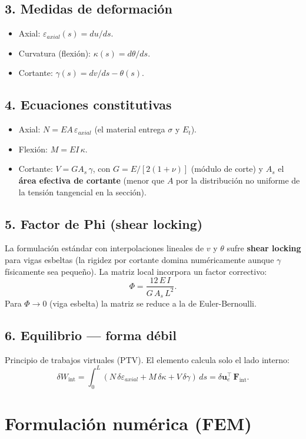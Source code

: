 \documentclass[11pt,letterpaper,oneside]{report}
\begin{document}
\subsection{3. Medidas de deformación}
\begin{itemize}
  \item Axial: $\varepsilon_{axial}(s) = du/ds$.
  \item Curvatura (flexión): $\kappa(s) = d\theta/ds$.
  \item Cortante: $\gamma(s) = dv/ds - \theta(s)$.
\end{itemize}

\subsection{4. Ecuaciones constitutivas}
\begin{itemize}
  \item Axial: $N = EA\,\varepsilon_{axial}$ (el material entrega $\sigma$ y $E_t$).
  \item Flexión: $M = EI\,\kappa$.
  \item Cortante: $V = G A_s\,\gamma$, con $G = E/[2(1+\nu)]$ (módulo de corte) y $A_s$ el \textbf{área efectiva de cortante} (menor que $A$ por la distribución no uniforme de la tensión tangencial en la sección).
\end{itemize}

\subsection{5. Factor de Phi (shear locking)}
La formulación estándar con interpolaciones lineales de $v$ y $\theta$ sufre \textbf{shear locking} para vigas esbeltas (la rigidez por cortante domina numéricamente aunque $\gamma$ físicamente sea pequeño). La matriz local incorpora un factor correctivo:
\[
\Phi = \frac{12\,E\,I}{G\,A_s\,L^2}.
\]
Para $\Phi \to 0$ (viga esbelta) la matriz se reduce a la de Euler-Bernoulli.

\subsection{6. Equilibrio --- forma débil}
Principio de trabajos virtuales (PTV). El elemento calcula solo el lado interno:
\[
\delta W_{\text{int}} = \int_0^L (N\,\delta\varepsilon_{axial} + M\,\delta\kappa + V\,\delta\gamma)\,ds = \delta\mathbf u_e^\top\,\mathbf F_{\text{int}}.
\]


\section{Formulación numérica (FEM)}
\end{document}
